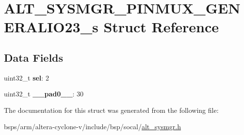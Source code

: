 \hypertarget{structALT__SYSMGR__PINMUX__GENERALIO23__s}{}\section{A\+L\+T\+\_\+\+S\+Y\+S\+M\+G\+R\+\_\+\+P\+I\+N\+M\+U\+X\+\_\+\+G\+E\+N\+E\+R\+A\+L\+I\+O23\+\_\+s Struct Reference}
\label{structALT__SYSMGR__PINMUX__GENERALIO23__s}
\subsection*{Data Fields}
\begin{DoxyCompactItemize}
\item 
\mbox{\label{structALT__SYSMGR__PINMUX__GENERALIO23__s_a7b226333f9374161663aaf2e16aaab5d}} 
uint32\+\_\+t {\bfseries sel}\+: 2
\item 
\mbox{\label{structALT__SYSMGR__PINMUX__GENERALIO23__s_a8d263332e3d79f1546fd16417cef9d22}} 
uint32\+\_\+t {\bfseries \+\_\+\+\_\+pad0\+\_\+\+\_\+}\+: 30
\end{DoxyCompactItemize}


The documentation for this struct was generated from the following file\+:\begin{DoxyCompactItemize}
\item 
bsps/arm/altera-\/cyclone-\/v/include/bsp/socal/\mbox{\hyperlink{alt__sysmgr_8h}{alt\+\_\+sysmgr.\+h}}\end{DoxyCompactItemize}
